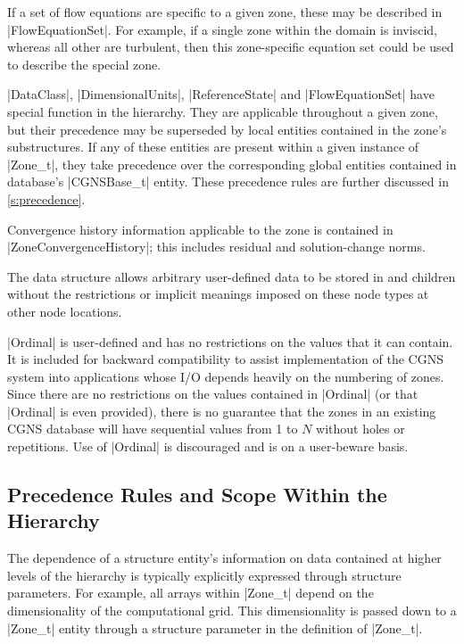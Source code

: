 If a set of flow equations are specific to a given zone, these may be
described in |FlowEquationSet|.  For example, if a single zone within
the domain is inviscid, whereas all other are turbulent, then this
zone-specific equation set could be used to describe the special zone.

|DataClass|, |DimensionalUnits|, |ReferenceState| and |FlowEquationSet| have
special function in the hierarchy.  They are applicable throughout a given
zone, but their precedence may be superseded by local entities contained in
the zone's substructures.  If any of these entities are present within a
given instance of |Zone_t|, they take precedence over the corresponding
global entities contained in database's |CGNSBase_t| entity.  These
precedence rules are further discussed in \autoref{s:precedence}.

Convergence history information applicable to the zone is contained in
|ZoneConvergenceHistory|; this includes residual and solution-change norms.

The  data structure allows arbitrary
user-defined data to be stored in  and
 children without the restrictions or implicit
meanings imposed on these node types at other node locations.

|Ordinal| is user-defined and has no restrictions on the values that
it can contain.
It is included for backward compatibility to assist implementation
of the CGNS system into  applications whose I/O depends heavily on the
numbering of zones.
Since there are no restrictions on the values contained in |Ordinal|
(or that |Ordinal| is even provided), there is no guarantee that the
zones in an existing CGNS database will have sequential values from
1 to $N$ without holes or repetitions.
Use of |Ordinal| is discouraged and is on a user-beware basis.

\subsection{Precedence Rules and Scope Within the Hierarchy}
\label{s:precedence}

The dependence of a structure entity's information on data contained at 
higher levels of the hierarchy is typically explicitly expressed through
structure parameters.  For example, all arrays within |Zone_t| depend on
the dimensionality of the computational grid.  This dimensionality is
passed down to a |Zone_t| entity through a structure parameter in the
definition of |Zone_t|.

